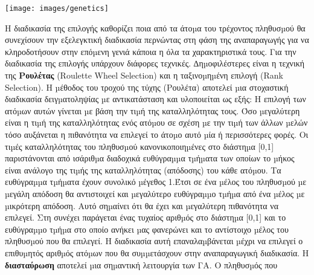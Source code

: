 \noindent\begin{minipage}{\linewidth}
\centering
{}
\texttt{[image: images/genetics]}
\label{fig:Genetics}
\end{minipage}

Η διαδικασία της επιλογής καθορίζει ποια από τα άτοµα του τρέχοντος πληθυσµού θα συνεχίσουν την εξελεγκτική διαδικασία περνώντας στη φάση της αναπαραγωγής για να κληροδοτήσουν στην επόµενη γενιά κάποια η όλα τα χαρακτηριστικά τους. Για την διαδικασία της επιλογής υπάρχουν διάφορες τεχνικές. ∆ηµοφιλέστερες είναι η τεχνική της \textbf{Ρουλέτας} \label{roul} (Roulette Wheel Selection) και η ταξινοµηµένη επιλογή (Rank Selection). Η µέθοδος του τροχού της τύχης (Ρουλέτα) αποτελεί µια στοχαστική διαδικασία δειγµατοληψίας µε αντικατάσταση και υλοποιείται ως εξής:
Η επιλογή των ατόµων αυτών γίνεται µε βάση την τιµή της καταλληλότητας τους. Όσο µεγαλύτερη είναι η τιµή της καταλληλότητας ενός ατόµου σε σχέση µε την τιµή των άλλων µελών τόσο αυξάνεται η πιθανότητα να επιλεγεί το άτοµο αυτό µία ή περισσότερες φορές. Οι τιµές καταλληλότητας του πληθυσµού κανονικοποιηµένες στο διάστηµα [0,1] παριστάνονται από ισάριθµα διαδοχικά ευθύγραµµα τµήµατα των οποίων το µήκος είναι ανάλογο της τιµής της καταλληλότητας (απόδοσης) του κάθε ατόµου. Τα ευθύγραµµα τµήµατα έχουν συνολικό µέγεθος 1.Έτσι σε ένα µέλος του πληθυσµού µε µεγάλη απόδοση θα αντιστοιχεί και µεγαλύτερο ευθύγραµµο τµήµα από ένα µέλος µε µικρότερη απόδοση. Αυτό σηµαίνει ότι θα έχει και µεγαλύτερη πιθανότητα να επιλεγεί. Στη συνέχει παράγεται ένας τυχαίος αριθµός στο διάστηµα [0,1] και το ευθύγραµµο τµήµα στο οποίο ανήκει µας φανερώνει και το αντίστοιχο µέλος του πληθυσµού που θα επιλεγεί. Η διαδικασία αυτή επαναλαµβάνεται µέχρι να επιλεγεί ο επιθυµητός αριθµός ατόµων που θα συµµετάσχουν στην αναπαραγωγική διαδικασία.
\label {cross} Η \textbf{διασταύρωση} αποτελεί µια σηµαντική λειτουργία των ΓΑ. Ο πληθυσµός που
